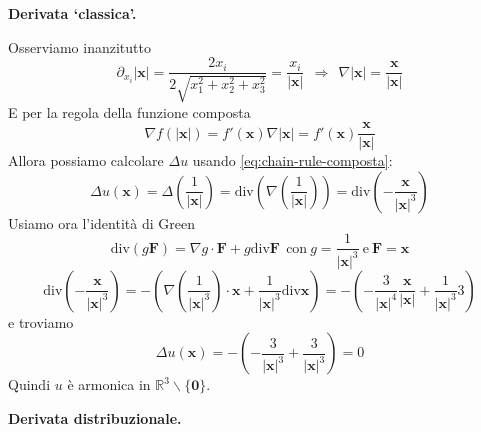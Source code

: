 \documentclass[10pt,a4paper,twoside,openright]{book}
\begin{document}
\textbf{Derivata `classica'.}

Osserviamo inanzitutto 
\begin{equation*}
	\partial _{x_{i}}| \mathbf{x}| =\frac{2x_{i}}{2\sqrt{x^{2}_{1} +x^{2}_{2} +x^{2}_{3}}} =\frac{x_{i}}{| \mathbf{x}| } \ \ \Rightarrow \ \ \nabla | \mathbf{x}| =\frac{\mathbf{x}}{| \mathbf{x}| }
\end{equation*}
E per la regola della funzione composta
\begin{equation}
	\nabla f(| \mathbf{x}| ) =f'(\mathbf{x}) \nabla | \mathbf{x}| =f'(\mathbf{x})\frac{\mathbf{x}}{| \mathbf{x}| }
	\label{eq:chain-rule-composta}
\end{equation}
Allora possiamo calcolare $\displaystyle \Delta u$ usando \eqref{eq:chain-rule-composta}:
\begin{equation*}
	\Delta u(\mathbf{x}) =\Delta \left(\frac{1}{| \mathbf{x}| }\right) =\mathrm{div}\left( \nabla \left(\frac{1}{| \mathbf{x}| }\right)\right) =\mathrm{div}\left( -\frac{\mathbf{x}}{| \mathbf{x}| ^{3}}\right)
\end{equation*}
Usiamo ora l'identità di Green 
\begin{equation*}
	\mathrm{div}( g\mathbf{F}) =\nabla g\cdotp \mathbf{F} +g\mathrm{div}\mathbf{F} \ \ \text{con} \ g=\frac{1}{| \mathbf{x}| ^{3}} \ \text{e} \ \mathbf{F} =\mathbf{x}
\end{equation*}
\begin{equation*}
	\mathrm{div}\left( -\frac{\mathbf{x}}{| \mathbf{x}| ^{3}}\right) =-\left( \nabla \left(\frac{1}{| \mathbf{x}| ^{3}}\right) \cdotp \mathbf{x} +\frac{1}{| \mathbf{x}| ^{3}}\mathrm{div}\mathbf{x}\right) =-\left( -\frac{3}{| \mathbf{x}| ^{4}}\frac{\mathbf{x}}{| \mathbf{x}| } +\frac{1}{| \mathbf{x}| ^{3}} 3\right)
\end{equation*}
e troviamo
\begin{equation*}
	\Delta u(\mathbf{x}) =-\left( -\frac{3}{| \mathbf{x}| ^{3}} +\frac{3}{| \mathbf{x}| ^{3}}\right) =0
\end{equation*}
Quindi $\displaystyle u$ è armonica in $\displaystyle \mathbb{R}^{3} \backslash \{\mathbf{0}\}$.



\textbf{Derivata distribuzionale.}
\end{document}
